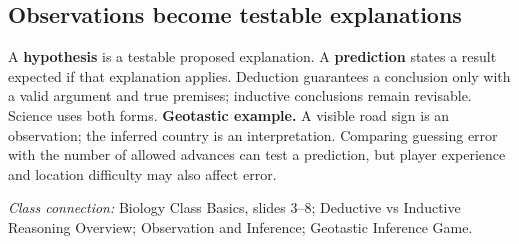 \documentclass[11pt,letterpaper]{article}
\newcommand{\ico}[3][forest]{{\fontsize{#3}{#3}\selectfont\textcolor{#1}{#2}}}
\newcommand{\pn}[3]{\ico[#1]{#2}{19pt}\\[2pt]#3}
\newcommand{\classsource}[1]{{\footnotesize\textit{Class connection:} #1\par}}
\begin{document}
\subsection*{Observations become testable explanations}
\begin{center}
\par
\end{center}
A \textbf{hypothesis} is a testable proposed explanation. A \textbf{prediction} states a result expected if that explanation applies. Deduction guarantees a conclusion only with a valid argument and true premises; inductive conclusions remain revisable. Science uses both forms.
\textbf{Geotastic example.} A visible road sign is an observation; the inferred country is an interpretation. Comparing guessing error with the number of allowed advances can test a prediction, but player experience and location difficulty may also affect error.
\classsource{Biology Class Basics, slides 3--8; Deductive vs Inductive Reasoning Overview; Observation and Inference; Geotastic Inference Game.}
\end{document}
